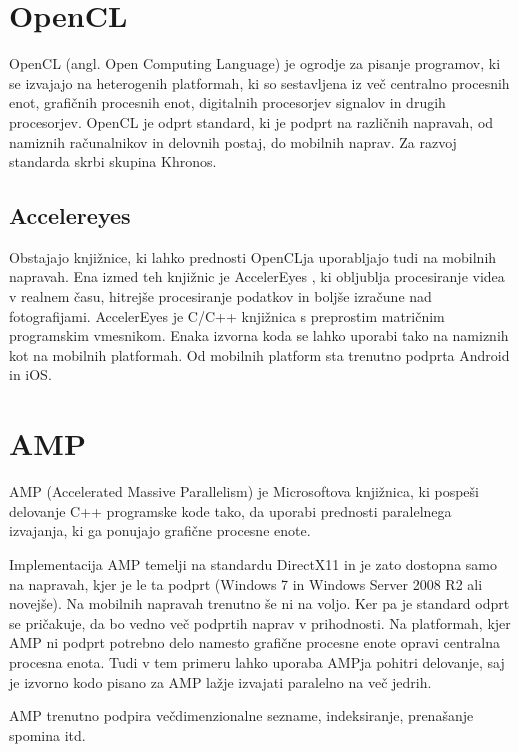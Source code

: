 \section{OpenCL}

OpenCL (angl. Open Computing Language) \cite{opencl} je ogrodje za pisanje programov, ki se izvajajo na heterogenih platformah, ki so sestavljena iz več centralno procesnih enot, grafičnih procesnih enot, digitalnih procesorjev signalov in drugih procesorjev. OpenCL je odprt standard, ki je podprt na različnih napravah, od namiznih računalnikov in delovnih postaj, do mobilnih naprav. Za razvoj standarda skrbi skupina Khronos.

\subsection{Accelereyes}

Obstajajo knjižnice, ki lahko prednosti OpenCLja uporabljajo tudi na mobilnih napravah. Ena izmed teh knjižnic je AccelerEyes \cite{accelereyes}, ki obljublja procesiranje videa v realnem času, hitrejše procesiranje podatkov in boljše izračune nad fotografijami. AccelerEyes je C/C++ knjižnica s preprostim matričnim programskim vmesnikom. Enaka izvorna koda se lahko uporabi tako na namiznih kot na mobilnih platformah. Od mobilnih platform sta trenutno podprta Android in iOS.

\section{AMP}

AMP (Accelerated Massive Parallelism) je Microsoftova knjižnica, ki pospeši delovanje C++ programske kode tako, da uporabi prednosti paralelnega izvajanja, ki ga ponujajo grafične procesne enote. 

Implementacija AMP temelji na standardu DirectX11 in je zato dostopna samo na napravah, kjer je le ta podprt (Windows 7 in Windows Server 2008 R2 ali novejše). Na mobilnih napravah trenutno še ni na voljo. Ker pa je standard odprt se pričakuje, da bo vedno več podprtih naprav v prihodnosti. Na platformah, kjer AMP ni podprt potrebno delo namesto grafične procesne enote opravi centralna procesna enota. Tudi v tem primeru lahko uporaba AMPja pohitri delovanje, saj je izvorno kodo pisano za AMP lažje izvajati paralelno na več jedrih.

AMP trenutno podpira večdimenzionalne sezname, indeksiranje, prenašanje spomina itd.

